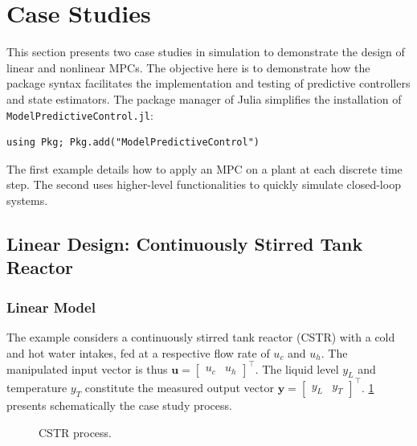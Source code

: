 \section{Case Studies}
\label{sec:case_studies}

This section presents two case studies in simulation to demonstrate the design of linear and nonlinear MPCs. The objective here is to demonstrate how the package syntax facilitates the implementation and testing of predictive controllers and state estimators. The package manager of Julia simplifies the installation of \texttt{ModelPredictiveControl.jl}:
\begin{verbatim}
using Pkg; Pkg.add("ModelPredictiveControl")
\end{verbatim}
The first example details how to apply an MPC on a plant at each discrete time step. The second uses higher-level functionalities to quickly simulate closed-loop systems.

\subsection{Linear Design: Continuously Stirred Tank Reactor}

\subsubsection{Linear Model}

The example considers a continuously stirred tank reactor (CSTR) with a cold and hot water intakes, fed at a respective flow rate of $u_c$ and $u_h$. The manipulated input vector is thus $\mathbf{u} = [\begin{smallmatrix}u_c & u_h\end{smallmatrix}]^\intercal$. The liquid level $y_L$ and temperature $y_T$ constitute the measured output vector $\mathbf{y} = [\begin{smallmatrix}y_L & y_T\end{smallmatrix}]^\intercal$. \cref{fig:cstr} presents schematically the case study process.

\begin{figure}[b]
    \centering
    \caption{CSTR process.}
    
    \label{fig:cstr}
\end{figure}

